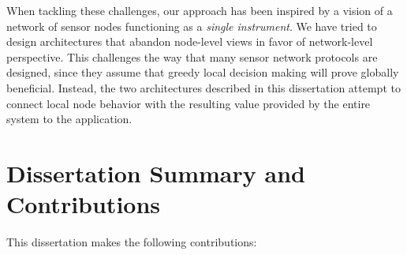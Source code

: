 When tackling these challenges, our approach has been inspired by a vision of
a network of sensor nodes functioning as a \textit{single instrument}. We
have tried to design architectures that abandon node-level views in favor of
network-level perspective. This challenges the way that many sensor network
protocols are designed, since they assume that greedy local decision making
will prove globally beneficial. Instead, the two architectures described in
this dissertation attempt to connect local node behavior with the resulting
value provided by the entire system to the application.

\section{Dissertation Summary and Contributions}

\vspace*{-0.1in}

This dissertation makes the following contributions:

